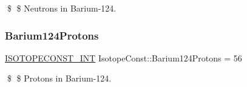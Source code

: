 \$ \$ Neutrons in Barium-\/124. \mbox{\label{group___isotope_const-_barium-_ba124_ga657ed4feb1f88f1699d618414d47b4c3}} 
\subsubsection{\texorpdfstring{Barium124\+Protons}{Barium124Protons}}
{\footnotesize\ttfamily \mbox{\hyperlink{group___isotope_const-_macros_ga5f18360b3e99483a35c32d789e62621c}{I\+S\+O\+T\+O\+P\+E\+C\+O\+N\+S\+T\+\_\+\+I\+NT}} Isotope\+Const\+::\+Barium124\+Protons = 56}

\$ \$ Protons in Barium-\/124. 